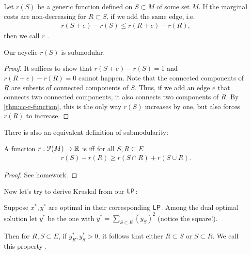 \begin{definition}
    Let $r(S)$ be a generic function defined on $S \subset M$ of some set $M$.
    If the marginal costs are non-decreasing for $R \subset S$, if we add the same edge, i.e.
    \begin{align*}
        r(S+e)-r(S) \leq r(R+e) - r(R),
    \end{align*}
    then we call $r$ .
\end{definition}
\begin{theorem}
    Our acyclic-$r(S)$ is submodular.
\end{theorem}
\begin{proof}
    It suffices to show that $r(S+e)-r(S)=1$ and $r(R+e)-r(R)=0$ cannot happen.
    Note that the connected components of $R$ are subsets of connected components of $S$. Thus, if we add an edge $e$ that connects two
    connected components, it also connects two components of $R$. By \autoref{thm:cc-r-function}, this is the only way $r(S)$ increases by one,
    but also forces $r(R)$ to increase.
\end{proof}
There is also an equivalent definition of submodularity:
\begin{theorem}
    A function $r : \mathcal{P}(M) \rightarrow \realnum$ is  iff for all $S,R \subseteq E$
    \begin{align*}
        r(S)+r(R) \geq r(S\cap R) + r(S \cup R).
    \end{align*}
\end{theorem}
\begin{proof}
    See homework. 
\end{proof}
Now let's try to derive Kruskal from our $\mathsf{LP}$:
\begin{theorem}
    Suppose $x^*,y^*$ are optimal in their corresponding $\mathsf{LP}$. Among the dual optimal
    solution let $y^*$ be the one with $y^*=\sum_{S\subset E}(y_S)^2$ (notice the square!).

    Then for $R,S \subset E$, if $y_R^*, y_S^* > 0$, it follows that either $R \subset S$ or $S \subset R$.
    We call this property .
\end{theorem}
